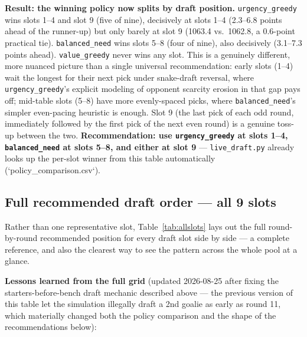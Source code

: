 \documentclass[11pt, a4paper]{article}
\begin{document}
\textbf{Result: the winning policy now splits by draft position.} \texttt{urgency\_greedy} wins
slots 1--4 and slot 9 (five of nine), decisively at slots 1--4 (2.3--6.8 points ahead of the
runner-up) but only barely at slot 9 (1063.4 vs.\ 1062.8, a 0.6-point practical tie).
\texttt{balanced\_need} wins slots 5--8 (four of nine), also decisively (3.1--7.3 points ahead).
\texttt{value\_greedy} never wins any slot. This is a genuinely different, more nuanced picture
than a single universal recommendation: early slots (1--4) wait the longest for their next pick
under snake-draft reversal, where \texttt{urgency\_greedy}'s explicit modeling of opponent
scarcity erosion in that gap pays off; mid-table slots (5--8) have more evenly-spaced picks,
where \texttt{balanced\_need}'s simpler even-pacing heuristic is enough. Slot 9 (the last pick of
each odd round, immediately followed by the first pick of the next even round) is a genuine
toss-up between the two. \textbf{Recommendation: use \texttt{urgency\_greedy} at slots 1--4,
\texttt{balanced\_need} at slots 5--8, and either at slot 9} — \texttt{live\_draft.py} already
looks up the per-slot winner from this table automatically (`policy\_comparison.csv`).

\subsection{Full recommended draft order — all 9 slots}
\label{sec:allslots}

Rather than one representative slot, Table~\ref{tab:allslots} lays out the full round-by-round
recommended position for every draft slot side by side — a complete reference, and also the
clearest way to see the pattern across the whole pool at a glance.

\textbf{Lessons learned from the full grid} (updated 2026-08-25 after fixing the
starters-before-bench draft mechanic described above — the previous version of this table let
the simulation illegally draft a 2nd goalie as early as round 11, which materially changed both
the policy comparison and the shape of the recommendations below):
\end{document}
